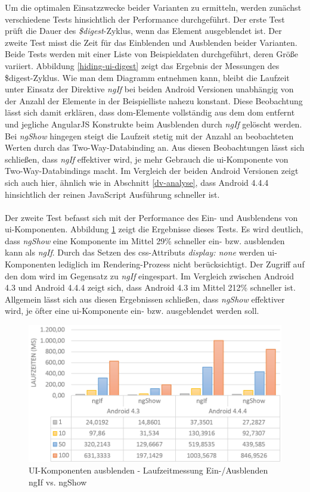 Um die optimalen Einsatzzwecke beider Varianten zu ermitteln, werden zunächst verschiedene Tests hinsichtlich der Performance durchgeführt. Der erste Test prüft die Dauer des \emph{\$digest}-Zyklus, wenn das Element ausgeblendet ist. Der zweite Test misst die Zeit für das Einblenden und Ausblenden beider Varianten. Beide Tests werden mit einer Liste von Beispieldaten durchgeführt, deren Größe variiert. Abbildung \ref{hiding-ui-digest} zeigt das Ergebnis der Messungen des \$digest-Zyklus. Wie man dem Diagramm entnehmen kann, bleibt die Laufzeit unter Einsatz der Direktive \emph{ngIf} bei beiden Android Versionen unabhängig von der Anzahl der Elemente in der Beispielliste nahezu konstant. Diese Beobachtung lässt sich damit erklären, dass \gls{dom}-Elemente vollständig aus dem \gls{dom} entfernt und jegliche AngularJS Konstrukte beim Ausblenden durch \emph{ngIf} gelöscht werden. Bei \emph{ngShow} hingegen steigt die Laufzeit stetig mit der Anzahl an beobachteten Werten durch das Two-Way-Databinding an. Aus diesen Beobachtungen lässt sich schließen, dass \emph{ngIf} effektiver wird, je mehr Gebrauch die \gls{ui}-Komponente von Two-Way-Databindings macht. Im Vergleich der beiden Android Versionen zeigt sich auch hier, ähnlich wie in Abschnitt \ref{dv-analyse}, dass Android 4.4.4 hinsichtlich der reinen JavaScript Ausführung schneller ist. 
\\\\
Der zweite Test befasst sich mit der Performance des Ein- und Ausblendens von \gls{ui}-Komponenten. Abbildung \ref{hiding-ui-hideshow} zeigt die Ergebnisse dieses Tests. Es wird deutlich, dass \emph{ngShow} eine Komponente im Mittel 29\% schneller ein- bzw. ausblenden kann als \emph{ngIf}. Durch das Setzen des \gls{css}-Attributs \emph{display: none} werden \gls{ui}-Komponenten lediglich im Rendering-Prozess nicht berücksichtigt. Der Zugriff auf den \gls{dom} wird im Gegensatz zu \emph{ngIf} eingespart. Im Vergleich zwischen Android 4.3 und Android 4.4.4 zeigt sich, dass Android 4.3 im Mittel 212\% schneller ist. Allgemein lässt sich aus diesen Ergebnissen schließen, dass \emph{ngShow} effektiver wird, je öfter eine \gls{ui}-Komponente ein- bzw. ausgeblendet werden soll. 
\begin{figure}[h]
	\centering
	\includegraphics[scale=0.4]{Bilder/Diagramme/HidingUI-ShowHide.png}
	\caption{UI-Komponenten ausblenden - Laufzeitmessung Ein-/Ausblenden ngIf vs. ngShow}
	\label{hiding-ui-hideshow}
\end{figure}